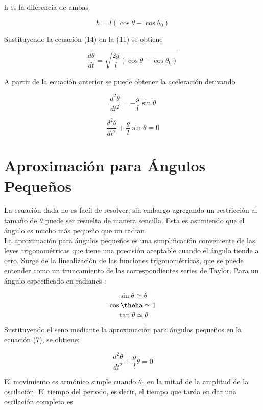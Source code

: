 \documentclass[12pt]{article}
\begin{document}
h es la diferencia de ambas

\begin{equation}
h=l(\cos \theta - \cos \theta_0)
\end{equation}

Sustituyendo la ecuación (14) en la (11) se obtiene

\begin{equation}
\frac{d\theta}{dt}=\sqrt{\frac{2g}{l}(\cos\theta-\cos \theta_0)}
\end{equation}

A partir de la ecuación anterior se puede obtener la aceleración derivando

\begin{equation}
\frac{d^2 \theta}{dt^2}=- \frac{g}{l} \sin \theta
\end{equation}

$$\frac{d^2 \theta}{dt^2}+ \frac{g}{l} \sin \theta =0 $$


\section{Aproximación para Ángulos Pequeños}

La ecuación dada no es facíl de resolver, sin embargo agregando un restricción al tamaño de $\theta$ puede ser resuelta de manera sencilla. Esta es asumiendo que el ángulo es mucho más pequeño que un radian.\\

La aproximación para ángulos pequeños es una simplificación conveniente de las leyes trigonométricas que tiene una precisión aceptable cuando el ángulo tiende a cero. Surge de la linealización de las funciones trigonométricas, que se puede entender como un truncamiento de las correspondientes series de Taylor. Para un ángulo especificado en radianes \cite{ang}:

 $$\sin\theta \simeq \theta$$
 $$ \cos \theha \simeq 1 $$
 $$ \tan \theta \simeq \theta $$
 
Sustituyendo el seno mediante la aproximación para ángulos pequeños en la ecuación (7), se obtiene:

\begin{equation}
\frac{d^2 \theta}{dt^2}+ \frac{g}{l} \theta =0
\end{equation}

El movimiento es armónico simple cuando $\theta_0$ en la mitad de la amplitud de la oscilación. El tiempo del periodo, es decir, el tiempo que tarda en dar una oscilación completa es
\end{document}
